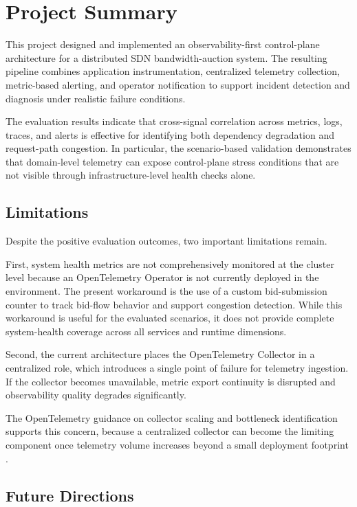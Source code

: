 \section{Project Summary}

This project designed and implemented an observability-first control-plane architecture for a distributed SDN bandwidth-auction system. The resulting pipeline combines application instrumentation, centralized telemetry collection, metric-based alerting, and operator notification to support incident detection and diagnosis under realistic failure conditions.

The evaluation results indicate that cross-signal correlation across metrics, logs, traces, and alerts is effective for identifying both dependency degradation and request-path congestion. In particular, the scenario-based validation demonstrates that domain-level telemetry can expose control-plane stress conditions that are not visible through infrastructure-level health checks alone.

\subsection{Limitations}

Despite the positive evaluation outcomes, two important limitations remain.

First, system health metrics are not comprehensively monitored at the cluster level because an OpenTelemetry Operator is not currently deployed in the environment. The present workaround is the use of a custom bid-submission counter to track bid-flow behavior and support congestion detection. While this workaround is useful for the evaluated scenarios, it does not provide complete system-health coverage across all services and runtime dimensions.

Second, the current architecture places the OpenTelemetry Collector in a centralized role, which introduces a single point of failure for telemetry ingestion. If the collector becomes unavailable, metric export continuity is disrupted and observability quality degrades significantly.

The OpenTelemetry guidance on collector scaling and bottleneck identification supports this concern, because a centralized collector can become the limiting component once telemetry volume increases beyond a small deployment footprint \cite{opentelemetryCollectorScaling}.

\subsection{Future Directions}

